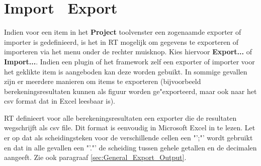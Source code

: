 \section {Import \ Export}
Indien voor een item in het \textbf{Project} toolvenster een zogenaamde exporter of importer is gedefinieerd, is het in RT mogelijk om gegevens te exporteren of importeren via het menu onder de rechter muisknop. Kies hiervoor \textbf{Export...} of \textbf{Import...}. Indien een plugin of het framework zelf een exporter of importer voor het geklikte item is aangeboden kan deze worden gebuikt. In sommige gevallen zijn er meerdere manieren om items te exporteren (bijvoorbeeld berekeningsresultaten kunnen als figuur worden ge"exporteerd, maar ook naar het csv format dat in Excel leesbaar is).

RT definieert voor alle berekeningsresultaten een exporter die de resultaten wegschrijft als csv file. Dit format is eenvoudig in Microsoft Excel in te lezen. Let er op dat als scheidingsteken voor de verschillende cellen een "';"' wordt gebruikt en dat in alle gevallen een "'."'  de scheiding tussen gehele getallen en de decimalen aangeeft. Zie ook paragraaf \ref{sec:General_Export_Output}.